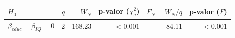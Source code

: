 
\begin{tabular}{lrrrrr}
\toprule
$H_0$ & $q$ & $W_N$ & p-valor ($\chi^2_q$) & $F_N=W_N/q$ & p-valor ($F$)\\
\midrule
$\beta_{educ}=\beta_{IQ}=0$ & 2 & 168.23 & $<0.001$ & 84.11 & $<0.001$\\
\bottomrule
\end{tabular}
